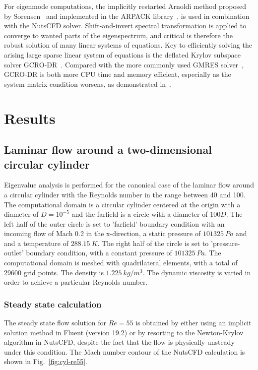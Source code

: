 \documentclass[journal,final]{new-aiaa}
\begin{document}
For eigenmode computations, the implicitly restarted Arnoldi method proposed
by Sorensen~\cite{sorensen1992implicit} and implemented in the ARPACK
library~\cite{lehoucq1998arpack}, is used
in combination with the NutsCFD solver.
Shift-and-invert spectral transformation is applied to converge to wanted parts
of the eigenspectrum, and critical is therefore the robust solution of many linear
systems of equations. 
Key to efficiently solving the arising large sparse linear system of equations
is the deflated Krylov subspace solver GCRO-DR~\cite{parks2006recycling}.
Compared with the more commonly used GMRES solver~\cite{saad1986gmres},
GCRO-DR is both more CPU time and memory efficient, especially as the system
matrix condition worsens, as demonstrated in~\cite{xu2016enabling,xu2017robust}.

\section{Results}
\label{label:results}

\subsection{Laminar flow around a two-dimensional circular cylinder}
Eigenvalue analysis is performed for the canonical case of the
laminar flow around a circular cylinder with the Reynolds number in
the range between 40 and 100. The computational domain is a
circular cylinder centered at the origin with a diameter of $D=10^{-5}$
and the farfield is a circle with a diameter of $100D$. The left half of
the outer circle is set to 'farfield' boundary condition with an incoming
flow of Mach 0.2 in the x-direction, a static pressure of $101325~Pa$ and
and a temperature of $288.15~K$.
The right half of the circle is set to 'pressure-outlet' boundary condition,
with a constant pressure of $101325~Pa$.
The computational domain is meshed with quadrilateral elements,
with a total of 29600 grid points. The density is $1.225~kg/m^3$.
The dynamic viscosity is varied in order to achieve a particular Reynolds number.

\subsubsection{Steady state calculation}
The steady state flow solution for $Re=55$ is obtained by either using an implicit solution method in
Fluent (version 19.2) or by resorting to the Newton-Krylov algorithm in NutsCFD,
despite the fact that the flow is physically unsteady under this condition. The
Mach number contour of the NutsCFD calculation is shown in Fig.~\ref{fig:cyl-re55}.
%
\end{document}
